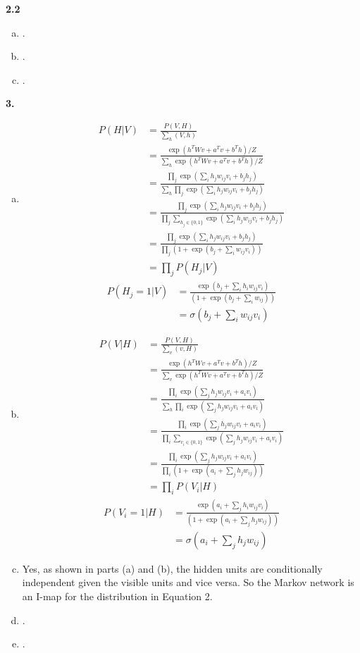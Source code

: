 \documentclass{article}
\begin{document}
\textbf{2.2} \begin{enumerate}[(a)]
    \item .
    \item .
    \item .
\end{enumerate}
\textbf{3.} \begin{enumerate}[(a)]
    \item \begin{align*}
        P(H | V) &= \frac{P(V, H)}{\sum_h (V, h)} \\
        &= \frac{\exp(h^TWv + a^Tv + b^Th)/Z}{\sum_h \exp(h^TWv + a^Tv + b^Th)/Z} \\[0.5ex]
        &= \frac{\prod_j \exp(\sum_i h_j w_{ij}v_i + b_jh_j)}{\sum_{h} \prod_j \exp(\sum_i h_j w_{ij}v_i + b_jh_j)} \\[0.5ex]
        &= \frac{\prod_j \exp(\sum_i h_j w_{ij}v_i + b_jh_j)}{\prod_j \sum_{h_j \in \{0, 1\}}\exp(\sum_i h_j w_{ij}v_i + b_jh_j)} \\[0.5ex]
        &= \frac{\prod_j \exp(\sum_i h_j w_{ij}v_i + b_jh_j)}{\prod_j (1 + \exp(b_j + \sum_i w_{ij}v_i))} \\[0.5ex]
        &= \prod_j P(H_j | V)
    \end{align*}
    \begin{align*}
        P(H_j = 1 | V) &= \frac{\exp( b_j + \sum_i h_i w_{ij}v_i)}{(1 + \exp(b_j + \sum_i w_{ij}))} \\[0.5ex]
        &= \sigma(b_j + \sum_{i} w_{ij}v_i)
    \end{align*}
    \item \begin{align*}
        P(V | H) &= \frac{P(V, H)}{\sum_v (v, H)} \\
        &= \frac{\exp(h^TWv + a^Tv + b^Th)/Z}{\sum_v \exp(h^TWv + a^Tv + b^Th)/Z} \\[0.5ex]
        &= \frac{\prod_i \exp(\sum_j h_j w_{ij}v_i + a_iv_i)}{\sum_{h} \prod_i \exp(\sum_j h_j w_{ij}v_i + a_iv_i)} \\[0.5ex]
        &= \frac{\prod_i \exp(\sum_j h_j w_{ij}v_i + a_iv_i)}{\prod_i \sum_{v_i \in \{0, 1\}}\exp(\sum_j h_j w_{ij}v_i + a_iv_i)} \\[0.5ex]
        &= \frac{\prod_i \exp(\sum_j h_j w_{ij}v_i + a_iv_i)}{\prod_i (1 + \exp(a_i + \sum_j h_jw_{ij}))} \\[0.5ex]
        &= \prod_i P(V_i| H)
    \end{align*}
    \begin{align*}
        P(V_i = 1 | H) &= \frac{\exp(a_i + \sum_j h_i w_{ij}v_i)}{(1 + \exp(a_i + \sum_j h_jw_{ij}))} \\[0.5ex]
        &= \sigma(a_i + \sum_{j} h_jw_{ij})
    \end{align*}
    \item Yes, as shown in parts (a) and (b), the hidden units are conditionally independent given the visible units and vice versa. So the Markov network is an I-map for the distribution in Equation 2.
    \item . 
    \item .
\end{enumerate}
\end{document}

